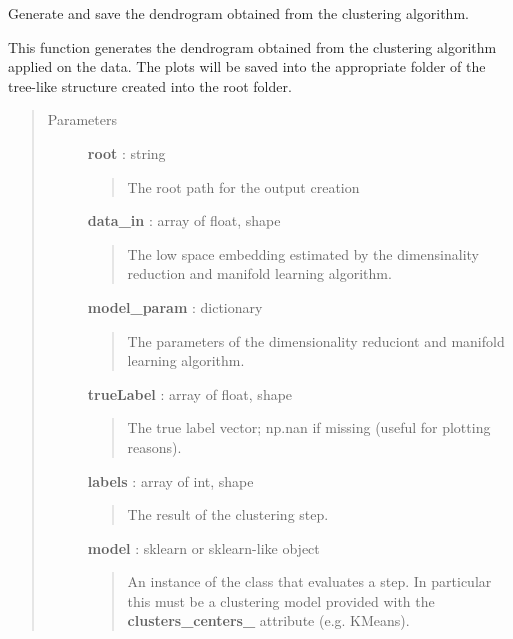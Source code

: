 \documentclass[letterpaper,10pt,english]{sphinxmanual}
\begin{document}

\begin{fulllineitems}
\label{index:adenine.core.analyze_results.make_dendrogram}
Generate and save the dendrogram obtained from the clustering algorithm.

This function generates the dendrogram obtained from the clustering algorithm applied on the data. The plots will be saved into the appropriate folder of the tree-like structure created into the root folder.
\begin{quote}\begin{description}
\item[{Parameters}] \leavevmode
\textbf{root} : string
\begin{quote}

The root path for the output creation
\end{quote}

\textbf{data\_in} : array of float, shape
\begin{quote}

The low space embedding estimated by the dimensinality reduction and manifold learning algorithm.
\end{quote}

\textbf{model\_param} : dictionary
\begin{quote}

The parameters of the dimensionality reduciont and manifold learning algorithm.
\end{quote}

\textbf{trueLabel} : array of float, shape
\begin{quote}

The true label vector; np.nan if missing (useful for plotting reasons).
\end{quote}

\textbf{labels} : array of int, shape
\begin{quote}

The result of the clustering step.
\end{quote}

\textbf{model} : sklearn or sklearn-like object
\begin{quote}

An instance of the class that evaluates a step. In particular this must be a clustering model provided with the {\color{red}\bfseries{}clusters\_centers\_} attribute (e.g. KMeans).
\end{quote}

\end{description}\end{quote}

\end{fulllineitems}
\end{document}
